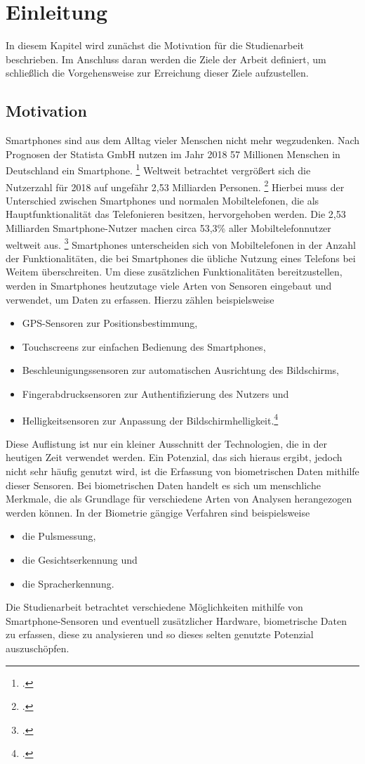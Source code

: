 \section{Einleitung}
In diesem Kapitel wird zunächst die Motivation für die Studienarbeit beschrieben. Im Anschluss daran werden die Ziele der Arbeit definiert, um  schließlich die Vorgehensweise zur Erreichung dieser Ziele aufzustellen.
\subsection{Motivation}
Smartphones sind aus dem Alltag vieler Menschen nicht mehr wegzudenken. Nach Prognosen der Statista GmbH nutzen im Jahr 2018 57 Millionen Menschen in Deutschland ein Smartphone. \footcite{Sta18a} Weltweit betrachtet vergrößert sich die Nutzerzahl für 2018 auf ungefähr 2,53 Milliarden Personen. \footcite{Sta18b}
Hierbei muss der Unterschied zwischen Smartphones und normalen Mobiltelefonen, die als Hauptfunktionalität das Telefonieren besitzen, hervorgehoben werden. Die 2,53 Milliarden Smartphone-Nutzer machen circa 53,3\% aller Mobiltelefonnutzer weltweit aus. \footcite{Sta18c} Smartphones unterscheiden sich von Mobiltelefonen in der Anzahl der Funktionalitäten, die bei Smartphones die übliche Nutzung eines Telefons bei Weitem überschreiten. Um diese zusätzlichen Funktionalitäten bereitzustellen, werden in Smartphones heutzutage viele Arten von Sensoren eingebaut und verwendet, um Daten zu erfassen. Hierzu zählen beispielsweise
\begin{itemize}[noitemsep, topsep=0pt]
	\item GPS-Sensoren zur Positionsbestimmung,
	\item Touchscreens zur einfachen Bedienung des Smartphones,
	\item Beschleunigungssensoren zur automatischen Ausrichtung des Bildschirms, 
	\item Fingerabdrucksensoren zur Authentifizierung des Nutzers und
	\item Helligkeitsensoren zur Anpassung der Bildschirmhelligkeit.\footcite[Vgl. ][]{Bie14}
\end{itemize}
Diese Auflistung ist nur ein kleiner Ausschnitt der Technologien, die in der heutigen Zeit verwendet werden. Ein Potenzial, das sich hieraus ergibt, jedoch nicht sehr häufig genutzt wird, ist die Erfassung von biometrischen Daten mithilfe dieser Sensoren. Bei biometrischen Daten handelt es sich um menschliche Merkmale, die als Grundlage für verschiedene Arten von Analysen herangezogen werden können. In der Biometrie gängige Verfahren sind beispielsweise
\begin{itemize}[noitemsep, topsep=0pt]
	\item die Pulsmessung,
	\item die Gesichtserkennung und
	\item die Spracherkennung.
\end{itemize} Die Studienarbeit betrachtet verschiedene Möglichkeiten mithilfe von Smartphone-Sensoren und eventuell zusätzlicher Hardware, biometrische Daten zu erfassen, diese zu analysieren und so dieses selten genutzte Potenzial auszuschöpfen.
